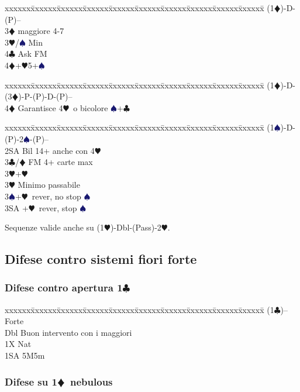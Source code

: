 \documentclass[a4paper,italian]{article}
\newcommand{\BC}{\textcolor{OliveGreen}{$\clubsuit$}}
\newcommand{\BD}{\textcolor{RedOrange}{$\vardiamondsuit$}}
\newcommand{\BH}{\textcolor{Red2}{$\varheartsuit${}}}
\newcommand{\BS}{\textcolor{MidnightBlue}{$\spadesuit${}}}
\newcommand{\pdfc}{\texorpdfstring{\BC{}}{C}}
\newcommand{\pdfd}{\texorpdfstring{\BD{}}{D}}
\newenvironment{bidtable}
{\begin{tabbing}

    xxxxxx\=xxxxxx\=xxxxxx\=xxxxxx\=xxxxxx\=xxxxxx\=xxxxxx\=xxxxxx\=xxxxxx\=xxxxxx\=\kill}
{\end{tabbing} }%
\begin{document}
\begin{multicols}{2}
    \begin{bidtable}
        (1\BD)-D-(P)--\+\\
        3\BD {} maggiore 4-7\+\\
        3\BH/\BS \> Min\\
        4\BC \> Ask FM\-\\
        4\BD {}+\BH 5+\BS \-
    \end{bidtable}
    \begin{bidtable}
        (1\BD)-D-(3\BD)-P-(P)-D-(P)--\+\\
        4\BD \> Garantisce 4\BH\ o bicolore \BS +\BC \-
    \end{bidtable}
    \begin{bidtable}
        (1\BS)-D-(P)-2\BS-(P)--\+\\
        2SA \> Bil 14+ anche con 4\BH \\
        3\BC/\BD \> FM 4+ carte max\+\\
        3\BH {}+\BH \-\\
        3\BH \> Minimo passabile\\
        3\BS {}+\BH\ rever, no stop \BS\\
        3SA +\BH\ rever, stop \BS\-
    \end{bidtable}

    Sequenze valide anche su (1\BH )-Dbl-(Pass)-2\BH.

    \subsection{Difese contro sistemi fiori forte}

    \subsubsection{Difese contro apertura 1\pdfc}

    \begin{bidtable}
        (1\BC)--\> Forte\+\\
        Dbl \> Buon intervento con i maggiori\\
        1X\> Nat\\
        1SA\> 5M5m
    \end{bidtable}

    \subsubsection{Difese su 1\pdfd\ nebulous}


\end{multicols}
\end{document}
